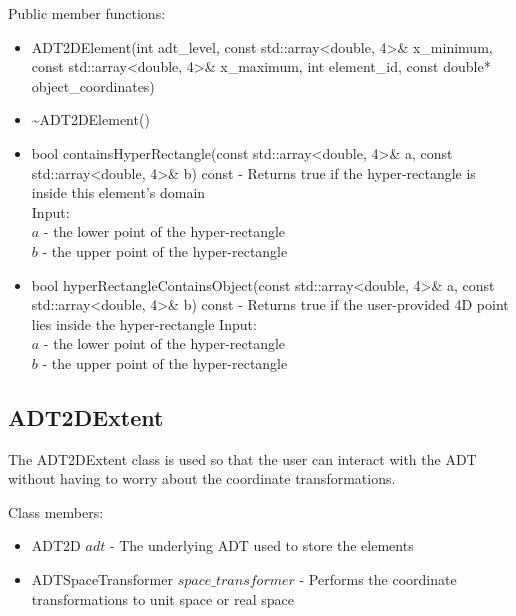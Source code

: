 \documentclass[manuscript, screen]{acmart}
\begin{document}
Public member functions:
\begin{itemize}
\item ADT2DElement(int adt\_level, const std::array<double, 4>\& x\_minimum, const std::array<double, 4>\& x\_maximum, int element\_id, const double* object\_coordinates)

\item \textasciitilde{}ADT2DElement()
%

\item bool containsHyperRectangle(const std::array<double, 4>\& a, const std::array<double, 4>\& b) const - Returns true if the hyper-rectangle is inside this element's domain\\
Input:\\
$a$ - the lower point of the hyper-rectangle\\
$b$ - the upper point of the hyper-rectangle

\item bool hyperRectangleContainsObject(const std::array<double, 4>\& a, const std::array<double, 4>\& b) const - Returns true if the user-provided 4D point lies inside the hyper-rectangle
Input:\\
$a$ - the lower point of the hyper-rectangle\\
$b$ - the upper point of the hyper-rectangle
\end{itemize}

\subsection{ADT2DExtent}
The ADT2DExtent class is used so that the user can interact with the ADT without having to worry about the coordinate transformations.

Class members:
\begin{itemize}
\item ADT2D $adt$ - The underlying ADT used to store the elements
\item ADTSpaceTransformer $space\_transformer$ - Performs the coordinate transformations to unit space or real space
\end{itemize}
\end{document}
